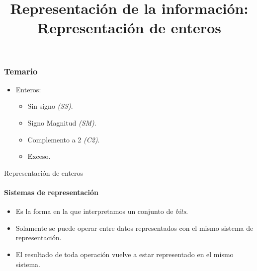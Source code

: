 \documentclass[11pt,a4paper,spanish]{beamer}
\title{Representación de la información:\\
Representación de enteros}
\author{}
\date{}
\begin{document}
\begin{frame}[noframenumbering]


    \maketitle
    \centering

\end{frame}

\begin{frame}[label=temario]

    \frametitle{Temario}

\begin{itemize}
    \item Enteros:
    \begin{itemize}
        \item Sin signo \emph{(SS)}.
        \item Signo Magnitud \emph{(SM)}.
        \item Complemento a 2 \emph{(C2)}.
        \item Exceso.
    \end{itemize}
\end{itemize}
\end{frame}

\begin{frame}{Representación de enteros}
    \framesubtitle{Sistemas de representación}
    \begin{itemize}
        \item Es la forma en la que interpretamos un conjunto de \emph{bits}.
        \item Solamente se puede operar entre datos representados con el mismo
            sistema de representación.
        \item El resultado de toda operación vuelve a estar representado en el
            mismo sistema.
    \end{itemize}
\end{frame}
\end{document}
